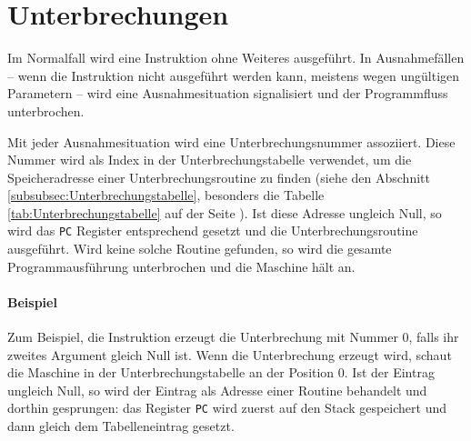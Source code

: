 \section{Unterbrechungen}
\label{sec:Unterbrechungen}

Im Normalfall wird eine Instruktion ohne Weiteres ausgeführt. In Ausnahmefällen
-- wenn die Instruktion nicht ausgeführt werden kann, meistens wegen ungültigen
Parametern -- wird eine Ausnahmesituation signalisiert
und der Programmfluss unterbrochen.


Mit jeder Ausnahmesituation wird eine Unterbrechungsnummer assoziiert. Diese
Nummer wird als Index in der Unterbrechungstabelle verwendet, um die
Speicheradresse einer Unterbrechungsroutine zu finden (siehe den Abschnitt
\ref{subsubsec:Unterbrechungstabelle}, besonders die Tabelle
\ref{tab:Unterbrechungstabelle} auf der Seite
\pageref{tab:Unterbrechungstabelle}). Ist diese Adresse ungleich Null, so wird
das \texttt{PC} Register entsprechend gesetzt und die Unterbrechungsroutine
ausgeführt. Wird keine solche Routine gefunden, so wird die gesamte
Programmausführung unterbrochen und die Maschine hält an.


\paragraph{Beispiel}
Zum Beispiel, die  Instruktion erzeugt die Unterbrechung mit Nummer
0, falls ihr zweites Argument gleich Null ist. Wenn die Unterbrechung erzeugt
wird, schaut die Maschine in der Unterbrechungstabelle an der Position 0. Ist
der Eintrag ungleich Null, so wird der Eintrag als Adresse einer Routine
behandelt und dorthin gesprungen: das Register \texttt{PC} wird
zuerst auf den Stack gespeichert und dann gleich dem Tabelleneintrag gesetzt.

